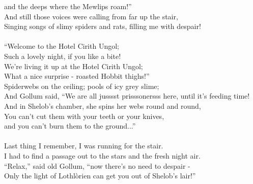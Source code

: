 \begin{multicols}{2}
and the deeps where the Mewlips roam!”
\\
And still those voices were calling from far up the stair,
\\
Singing songs of slimy spiders and rats, filling me with despair!
\\
\\
“Welcome to the Hotel Cirith Ungol;
\\
Such a lovely night, if you like a bite!
\\
We’re living it up at the Hotel Cirith Ungol;
\\
What a nice surprise - roasted Hobbit thighs!”
\\
Spiderwebs on the ceiling; pools of icy grey slime;
\\
And Gollum said, “We are all jusssst prisssonersss here, until it’s feeding time!
\\
And in Shelob’s chamber, she spins her webs round and round,
\\
You can’t cut them with your teeth or your knives,
\\
and you can’t burn them to the ground...”
\\
\\
Last thing I remember, I was running for the stair.
\\
I had to find a passage out to the stars and the fresh night air.
\\
“Relax,” said old Gollum, “now there’s no need to despair -
\\
Only the light of Lothl\`orien can get you out of Shelob’s lair!”
\end{multicols}